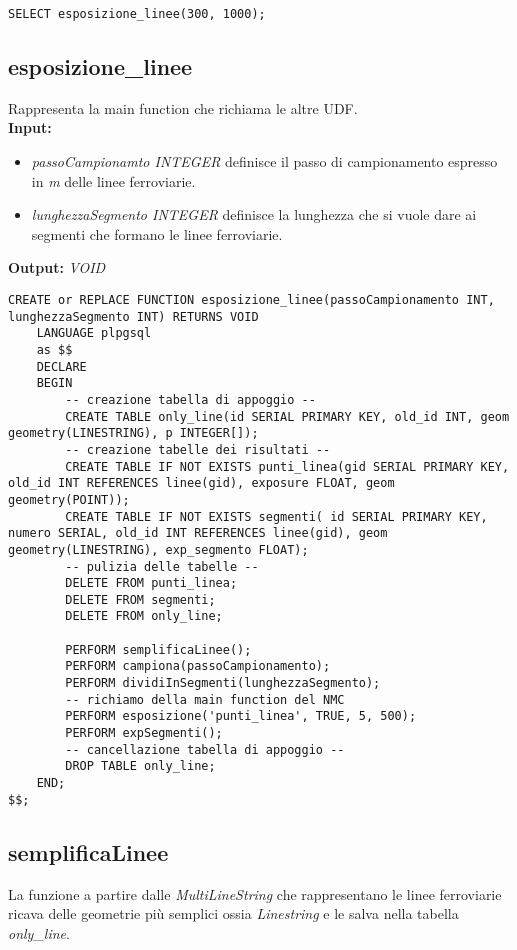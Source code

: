 \begin{lstlisting}[style=mySQL]
SELECT esposizione_linee(300, 1000);
\end{lstlisting}     

\subsection{esposizione\_linee}
Rappresenta la main function che richiama le altre UDF.\\
\textbf{Input:} 
\begin{itemize}
\item \textit{passoCampionamto INTEGER} definisce il passo di campionamento espresso in \textit{m} delle linee ferroviarie.
\item \textit{lunghezzaSegmento INTEGER} definisce la lunghezza che si vuole dare ai segmenti che formano le linee ferroviarie.
\end{itemize}
\textbf{Output:} \textit{VOID} 

\begin{lstlisting}[style=mySQL]
CREATE or REPLACE FUNCTION esposizione_linee(passoCampionamento INT, lunghezzaSegmento INT) RETURNS VOID
	LANGUAGE plpgsql
	as $$
	DECLARE
	BEGIN
		-- creazione tabella di appoggio --
		CREATE TABLE only_line(id SERIAL PRIMARY KEY, old_id INT, geom geometry(LINESTRING), p INTEGER[]);
		-- creazione tabelle dei risultati --
		CREATE TABLE IF NOT EXISTS punti_linea(gid SERIAL PRIMARY KEY, old_id INT REFERENCES linee(gid), exposure FLOAT, geom geometry(POINT));
		CREATE TABLE IF NOT EXISTS segmenti( id SERIAL PRIMARY KEY, numero SERIAL, old_id INT REFERENCES linee(gid), geom geometry(LINESTRING), exp_segmento FLOAT);
		-- pulizia delle tabelle --
		DELETE FROM punti_linea;
		DELETE FROM segmenti;
		DELETE FROM only_line;
		
		PERFORM semplificaLinee();
		PERFORM campiona(passoCampionamento);
		PERFORM dividiInSegmenti(lunghezzaSegmento);
		-- richiamo della main function del NMC
		PERFORM esposizione('punti_linea', TRUE, 5, 500);
		PERFORM expSegmenti();
		-- cancellazione tabella di appoggio --
		DROP TABLE only_line;
	END;
$$;
\end{lstlisting}

\subsection{semplificaLinee}
La funzione a partire dalle \textit{MultiLineString} che rappresentano le linee ferroviarie ricava delle geometrie più semplici ossia \textit{Linestring} e le salva nella tabella \textit{only\_line}.\\

